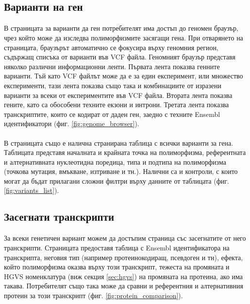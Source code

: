 \documentclass[pdftex,cyrillic,14pt,a4page,twoside,openright]{extreport}
\begin{document}
\subsection{Варианти на ген}
\paragraph{}
В страницата за варианти да ген потребителят има достъп до геномен браузър, чрез който може да изследва полиморфизмите засягащи гена. При отварянето на страницата, браузърът автоматично се фокусира върху геномния регион, съдържащ списъка от варианти във VCF файла. Геномният браузър представя няколко различни информационни ленти. Първата лента показва генните варианти. Тъй като VCF файлът може да е за един експеримент, или множество експерименти, тази лента показва също така и комбинациите от изразени варианти за всеки от експериментите във VCF файла. Втората лента показва гените, като са обособени техните екзони и интрони. Третата лента показва транскриптите, които се кодират от даден ген, заедно с техните Ensembl идентификатори (фиг. \ref{fig:genome_browser}).

\paragraph{}
В страницата също е налична странирана таблица с всички варианти за гена. Таблицата представя началната и крайната точка на полиморфизма, референтната и алтернативната нуклеотидна поредица, типа и подтипа на полиморфизма (точкова мутация, вмъкване, изтриване и тн.). Налични са и контроли, с които могат да бъдат прилагани сложни филтри върху данните от таблицата (фиг. \ref{fig:variants_list}).

\subsection{Засегнати транскрипти}\label{sec:affected_transcripts}
\paragraph{}
За всеки генетичен вариант можем да достъпим страница със засегнатите от него транскрипти. Страницата предоставя таблица с Ensembl идентификатора на транскрипта, неговия тип (например протеинокодиращ, псевдоген и тн), ефекта, който полиморфизма оказва върху този транскрипт, тежеста на промяната и HGVS номенклатура (виж секция \ref{sec:hgvs}) на промяната на протеина, ако има такава. Потребителят също така може да сравни и референтния и алтернативния протеин за този транскрипт (фиг. \ref{fig:protein_comparison}).
\end{document}
